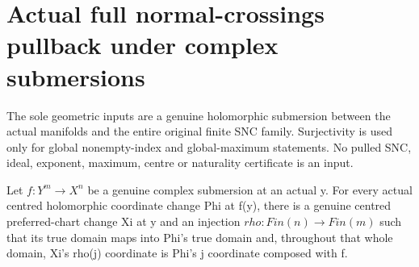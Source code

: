 \section{Actual full normal-crossings pullback under complex submersions}
The sole geometric inputs are a genuine holomorphic submersion between the
actual manifolds and the entire original finite SNC family. Surjectivity is
used only for global nonempty-index and global-maximum statements. No pulled
SNC, ideal, exponent, maximum, centre or naturality certificate is an input.

\begin{lemma}
\label{hir:submersion-nc-full-lifted-coordinates}
\leanok
Let $f:Y^m\to X^n$ be a genuine complex submersion at an actual y. For every
actual centred holomorphic coordinate change Phi at f(y), there is a genuine
centred preferred-chart change Xi at y and an injection $rho:Fin(n)\to Fin(m)$
such that its true domain maps into Phi's true domain and, throughout that
whole domain, Xi's rho(j) coordinate is Phi's j coordinate composed with f.
\end{lemma}
